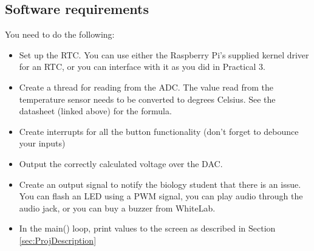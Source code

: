 \subsection{Software requirements}
You need to do the following:
\begin{itemize}
    \item Set up the RTC. You can use either the Raspberry Pi's supplied kernel driver for an RTC, or you can interface with it as you did in Practical 3.
    \item Create a thread for reading from the ADC. The value read from the temperature sensor needs to be converted to degrees Celsius. See the datasheet (linked above) for the formula.
    \item Create interrupts for all the button functionality (don't forget to debounce your inputs)
    \item Output the correctly calculated voltage over the DAC.
    \item Create an output signal to notify the biology student that there is an issue. You can flash an LED using a PWM signal, you can play audio through the audio jack, or you can buy a buzzer from WhiteLab. 
    \item In the main() loop, print values to the screen as described in Section \ref{sec:ProjDescription}
\end{itemize}

